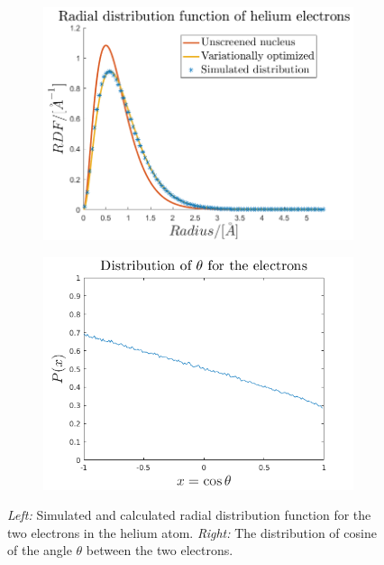 \begin{figure}[H]
    \centering
    \captionsetup[subfigure]{justification=centering}
    \begin{subfigure}[b]{0.48\textwidth}
        \centering
        \includegraphics[width=\textwidth]{graphics/task1/radius.png}
    \end{subfigure}
    \begin{subfigure}[b]{0.48\textwidth}
        \centering
        \includegraphics[width=\textwidth]{graphics/task1/angle_diff_dist.png}
    \end{subfigure}
    \caption{\textit{Left:} Simulated and calculated radial distribution function for the two electrons in the helium atom. \textit{Right:} The distribution of cosine of the angle $\theta$ between the two electrons.}
    \label{fig:RDF}
\end{figure}

